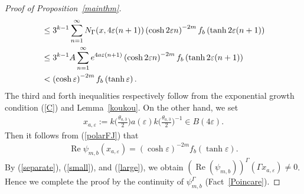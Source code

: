 \documentclass[11pt]{article}
\numberwithin{equation}{section}
\numberwithin{equation}{section}
\begin{document}
\begin{proof}[Proof of Proposition~\ref{mainthm}]
\begin{align}
&\leq 3^{k-1}\sum_{n = 1}^{\infty} N_{\Gamma}(x, 4\varepsilon (n + 1))\left(\cosh
2\varepsilon n \right)^{-2m} f_{b}\left(\tanh 2\varepsilon (n+1)\right)
\nonumber \\
&\leq 3^{k-1}A\sum_{n = 1}^{\infty} {\rm e}^{4a\varepsilon (n+1)}\left(\cosh 2\varepsilon n
\right)^{-2m} f_{b}\left(\tanh 2\varepsilon (n+1)\right)
\nonumber \\
&< \left(\cosh \varepsilon\right)^{-2m} f_{b}
\left(\tanh \varepsilon\right).
\label{small}
\end{align}
The third and forth inequalities respectively follow from
the exponential growth condition (\ref{C}) and Lemma~\ref{koukou}.
On the other hand, we set
\begin{gather*}
x_{a,\varepsilon}:=
k\bigg(\frac{\theta_{a,3}}{2}\bigg)a(\varepsilon)k\bigg(\frac{\theta_{a,3}}{2}\bigg)^{-1} \in B(4\varepsilon).
\end{gather*}
Then it follows from (\ref{polarFJ}) that
\begin{align}
\label{large}
\operatorname{Re} \psi_{m,b}(x_{a,\varepsilon})
=\left(\cosh \varepsilon\right)^{-2m} f_{b}
\left(\tanh \varepsilon\right).
\end{align}
By (\ref{separate}), (\ref{small}), and (\ref{large}),
we obtain $(\operatorname{Re}(\psi_{m,b}))^{\Gamma}(\Gamma x_{a,\varepsilon})\neq 0$.
Hence we complete the proof
by the continuity of $\psi_{m,b}^{\Gamma}$ (Fact~\ref{Poincare}).
\end{proof}
\end{document}
